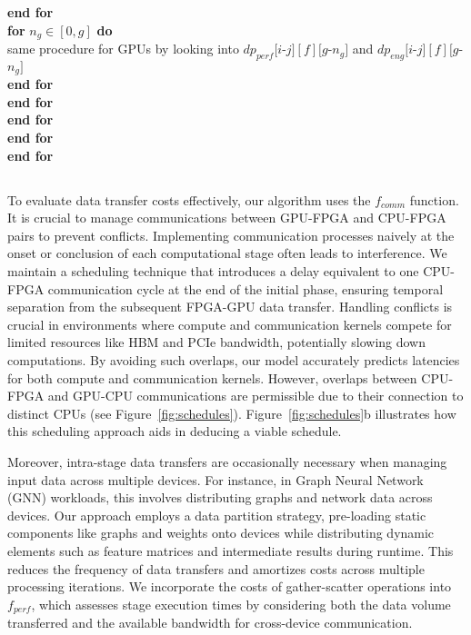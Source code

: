 \begin{algorithm}
\begin{algorithmic}[1]
                \hspace{1.3em} \textbf{end for}\\
                \hspace{1.3em} \textbf{for} {$n_g\in [0, g]$} \textbf{do}\\
                    \hspace{2.6em} same procedure for GPUs by looking into $dp_{perf}[i$-$j][f][g$-$n_g]$ and $dp_{eng}[i$-$j][f][g$-$n_g]$\\
                \hspace{1.3em} \textbf{end for} \\
\textbf{end for} \\
\textbf{end for} \\
\textbf{end for} \\
\textbf{end for}
\end{algorithmic}
\end{algorithm}
\setlength{\textfloatsep}{1pt}%

\subsection{}
To evaluate data transfer costs effectively, our algorithm uses the $f_{comm}$ function. It is crucial to manage communications between GPU-FPGA and CPU-FPGA pairs to prevent conflicts. Implementing communication processes naively at the onset or conclusion of each computational stage often leads to interference. We maintain a scheduling technique that introduces a delay equivalent to one CPU-FPGA communication cycle at the end of the initial phase, ensuring temporal separation from the subsequent FPGA-GPU data transfer. Handling conflicts is crucial in environments where compute and communication kernels compete for limited resources like HBM and PCIe\textsuperscript{\textregistered} bandwidth, potentially slowing down computations. By avoiding such overlaps, our model accurately predicts latencies for both compute and communication kernels. However, overlaps between CPU-FPGA and GPU-CPU communications are permissible due to their connection to distinct CPUs (see Figure~\ref{fig:schedules}). Figure~\ref{fig:schedules}b illustrates how this scheduling approach aids in deducing a viable schedule.

Moreover, intra-stage data transfers are occasionally necessary when managing input data across multiple devices. For instance, in Graph Neural Network (GNN) workloads, this involves distributing graphs and network data across devices. Our approach employs a data partition strategy, pre-loading static components like graphs and weights onto devices while distributing dynamic elements such as feature matrices and intermediate results during runtime. This reduces the frequency of data transfers and amortizes costs across multiple processing iterations. We incorporate the costs of gather-scatter operations into $f_{perf}$, which assesses stage execution times by considering both the data volume transferred and the available bandwidth for cross-device communication.


